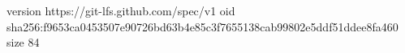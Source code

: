 version https://git-lfs.github.com/spec/v1
oid sha256:f9653ca0453507e90726bd63b4e85c3f7655138cab99802e5ddf51ddee8fa460
size 84
